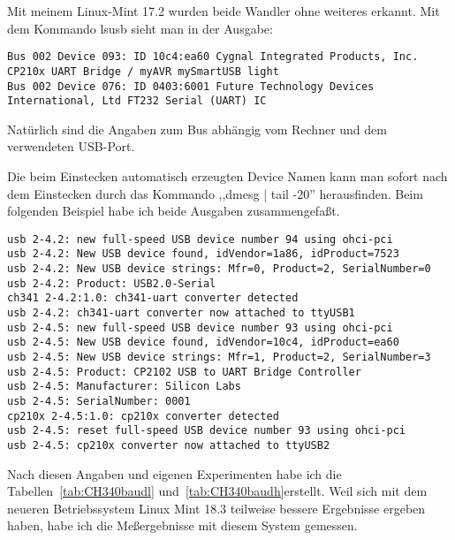 Mit meinem Linux-Mint 17.2 wurden beide Wandler ohne weiteres erkannt.
Mit dem Kommando lsusb sieht man in der Ausgabe:
\begin{verbatim}
Bus 002 Device 093: ID 10c4:ea60 Cygnal Integrated Products, Inc. CP210x UART Bridge / myAVR mySmartUSB light
Bus 002 Device 076: ID 0403:6001 Future Technology Devices International, Ltd FT232 Serial (UART) IC
\end{verbatim}
Natürlich sind die Angaben zum Bus abhängig vom Rechner und dem verwendeten USB-Port.

Die beim Einstecken automatisch erzeugten Device Namen kann man sofort nach dem Einstecken
durch das Kommando ,,dmesg | tail -20'' herausfinden. Beim folgenden Beispiel habe
ich beide Ausgaben zusammengefaßt.
\begin{verbatim}
usb 2-4.2: new full-speed USB device number 94 using ohci-pci
usb 2-4.2: New USB device found, idVendor=1a86, idProduct=7523
usb 2-4.2: New USB device strings: Mfr=0, Product=2, SerialNumber=0
usb 2-4.2: Product: USB2.0-Serial
ch341 2-4.2:1.0: ch341-uart converter detected
usb 2-4.2: ch341-uart converter now attached to ttyUSB1
usb 2-4.5: new full-speed USB device number 93 using ohci-pci
usb 2-4.5: New USB device found, idVendor=10c4, idProduct=ea60
usb 2-4.5: New USB device strings: Mfr=1, Product=2, SerialNumber=3
usb 2-4.5: Product: CP2102 USB to UART Bridge Controller
usb 2-4.5: Manufacturer: Silicon Labs
usb 2-4.5: SerialNumber: 0001
cp210x 2-4.5:1.0: cp210x converter detected
usb 2-4.5: reset full-speed USB device number 93 using ohci-pci
usb 2-4.5: cp210x converter now attached to ttyUSB2
\end{verbatim}

Nach diesen Angaben und eigenen Experimenten habe ich die Tabellen~\ref{tab:CH340baudl} und~\ref{tab:CH340baudh}erstellt. Weil sich mit dem neueren Betriebssystem Linux Mint 18.3 teilweise bessere Ergebnisse ergeben haben, habe ich die Meßergebnisse mit diesem System gemessen.

